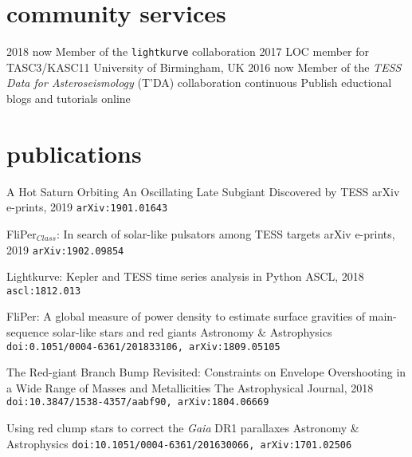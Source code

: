 \documentclass[]{k-cv} %
\begin{document}
\section{community services}
\begin{entrylist}
\entrythree
{2018 \to now}
{Member of the \texttt{lightkurve} collaboration}
{}
\entrythree
{2017}
{LOC member for TASC3/KASC11}
{University of Birmingham, UK}
\entrythree
{2016 \to now}
{Member of the \emph{TESS Data for Asteroseismology} (T'DA) collaboration }
{}
\entrythree
{continuous}
{Publish eductional blogs and tutorials online}
{}
\end{entrylist}
\section{publications}
{{A Hot Saturn Orbiting An Oscillating Late Subgiant Discovered by TESS}}
{arXiv e-prints, 2019}
{\texttt{arXiv:1901.01643}}

{FliPer$_{Class}$: In search of solar-like pulsators among TESS targets}
{arXiv e-prints, 2019}
{\texttt{arXiv:1902.09854}}

{Lightkurve: Kepler and TESS time series analysis in Python}
{ASCL, 2018}
{\texttt{ascl:1812.013}}

{FliPer: A global measure of power density to estimate surface gravities of main-sequence solar-like stars and red giants}
{Astronomy \& Astrophysics}
{\texttt{doi:0.1051/0004-6361/201833106, arXiv:1809.05105}}

{The Red-giant Branch Bump Revisited: Constraints on Envelope Overshooting in a Wide Range of Masses and Metallicities}
{The Astrophysical Journal, 2018}
{\texttt{doi:10.3847/1538-4357/aabf90, arXiv:1804.06669}}

{Using red clump stars to correct the \emph{Gaia} DR1 parallaxes}
{Astronomy \& Astrophysics}
{\texttt{doi:10.1051/0004-6361/201630066, arXiv:1701.02506}}
\end{document}

